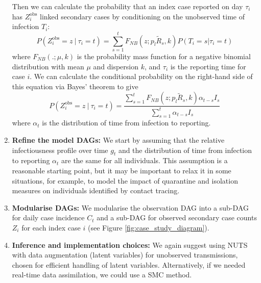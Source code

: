 \documentclass{article}
\begin{document}
\begin{enumerate}
   Then we can calculate the probability that an index case reported on day $\tau_i$ has $Z^\mathrm{obs}_i$ linked secondary cases by conditioning on the unobserved time of infection $T_i$:
   \begin{equation}
       P(Z^\mathrm{obs}_i=z \ | \ \tau_i=t) = \sum_{s=1}^{t} F_{NB}(z; p_l\tilde{R}_s,k) P(T_i=s | \tau_i=t)
   \end{equation}
where $F_{NB}(.;\mu,k)$ is the probability mass function for a negative binomial distribution with mean $\mu$ and dispersion $k$, and $\tau_i$ is the reporting time for case $i$.  We can calculate the conditional probability on the right-hand side of this equation via Bayes' theorem to give
   \begin{equation} \label{eq:Zobs}
       P(Z^\mathrm{obs}_i=z \ | \ \tau_i=t) = \frac{\sum_{s=1}^{t} F_{NB}(z; p_l\tilde{R}_s,k) \alpha_{t-s} I_s}{\sum_{s=1}^{t}\alpha_{t-s} I_s}  
   \end{equation}
 where $\alpha_t$ is the distribution of time from infection to reporting.

    \item \textbf{Refine the model DAGs:}  We start by assuming that the relative infectiousness profile over time $g_t$ and the distribution of time from infection to reporting $\alpha_t$ are the same for all individuals. This assumption is a reasonable starting point, but it may be important to relax it in some situations, for example, to model the impact of quarantine and isolation measures on individuals identified by contact tracing.

    \item \textbf{Modularise DAGs:} We modularise the observation \ac{DAG} into a sub-DAG for daily case incidence $C_t$ and a sub-DAG for observed secondary case counts $Z_i$ for each index case $i$ (see Figure \ref{fig:case_study_diagram}).  
    
    \item \textbf{Inference and implementation choices:} We again suggest using \ac{NUTS} with data augmentation (latent variables) for unobserved transmissions, chosen for efficient handling of latent variables. Alternatively, if we needed real-time data assimilation, we could use a \ac{SMC} method.


\end{enumerate}
\end{document}
